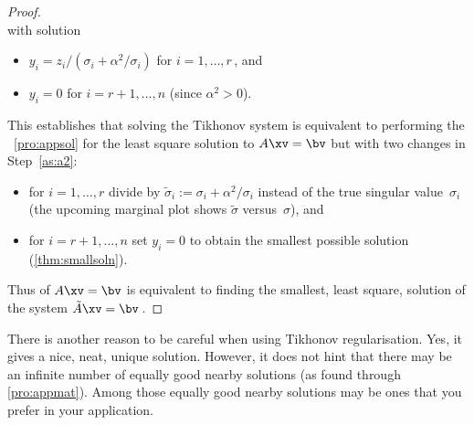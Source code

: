 \begin{proof}
\begin{equation*}
\end{equation*}
with solution 
\begin{itemize}
\item \(y_i=z_i/(\sigma_i+\alpha^2/\sigma_i)\) for \(i=1,\ldots,r\)\,, and
\item \(y_i=0\) for \(i=r+1,\ldots,n\) (since \(\alpha^2>0\)).
\end{itemize}
This establishes that solving the Tikhonov system is equivalent to performing the \svd\ \autoref{pro:appsol} for the least square solution to \(A\xv=\bv\) but with two changes in Step~\ref{as:a2}:
\begin{itemize}
\item for $i=1,\ldots,r$ divide by \(\tilde\sigma_i:=\sigma_i+\alpha^2/\sigma_i\) instead of the true singular value~\(\sigma_i\) (the upcoming marginal plot shows \(\tilde\sigma\) versus~\(\sigma\)), and
\item for $i=r+1,\ldots,n$ set \(y_i=0\) to obtain the smallest possible solution (\autoref{thm:smallsoln}).
\end{itemize}
Thus  of \(A\xv=\bv\) is equivalent to finding the smallest, {least square}, solution of the system \(\tilde A\xv=\bv\)\,.
\end{proof}


There is another reason to be careful when using Tikhonov regularisation. 
Yes, it gives a nice, neat, unique solution.
However, it does not hint that there may be an infinite number of equally good nearby solutions (as found through \autoref{pro:appmat}).
Among those equally good nearby solutions may be ones that you prefer in your application.

